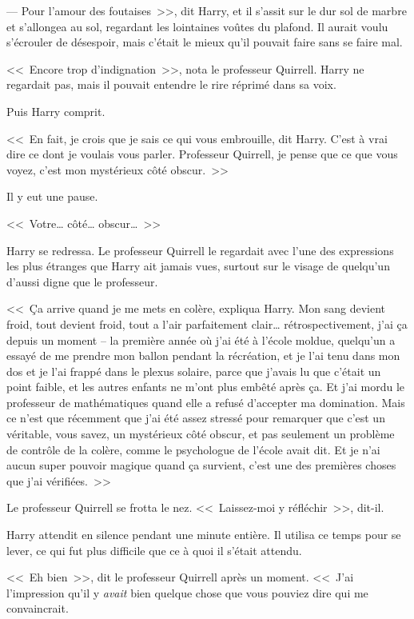 --- Pour l'amour des foutaises~>>, dit Harry, et il s'assit sur le dur sol de marbre et s'allongea au sol, regardant les lointaines voûtes du plafond. Il aurait voulu s'écrouler de désespoir, mais c'était le mieux qu'il pouvait faire sans se faire mal.

<<~Encore trop d'indignation~>>, nota le professeur Quirrell. Harry ne regardait pas, mais il pouvait entendre le rire réprimé dans sa voix.

Puis Harry comprit.

<<~En fait, je crois que je sais ce qui vous embrouille, dit Harry. C'est à vrai dire ce dont je voulais vous parler. Professeur Quirrell, je pense que ce que vous voyez, c'est mon mystérieux côté obscur.~>>

Il y eut une pause.

<<~Votre… côté… obscur…~>>

Harry se redressa. Le professeur Quirrell le regardait avec l'une des expressions les plus étranges que Harry ait jamais vues, surtout sur le visage de quelqu'un d'aussi digne que le professeur.

<<~Ça arrive quand je me mets en colère, expliqua Harry. Mon sang devient froid, tout devient froid, tout a l'air parfaitement clair… rétrospectivement, j'ai ça depuis un moment -- la première année où j'ai été à l'école moldue, quelqu'un a essayé de me prendre mon ballon pendant la récréation, et je l'ai tenu dans mon dos et je l'ai frappé dans le plexus solaire, parce que j'avais lu que c'était un point faible, et les autres enfants ne m'ont plus embêté après ça. Et j'ai mordu le professeur de mathématiques quand elle a refusé d'accepter ma domination. Mais ce n'est que récemment que j'ai été assez stressé pour remarquer que c'est un véritable, vous savez, un mystérieux côté obscur, et pas seulement un problème de contrôle de la colère, comme le psychologue de l'école avait dit. Et je n'ai aucun super pouvoir magique quand ça survient, c'est une des premières choses que j'ai vérifiées.~>>

Le professeur Quirrell se frotta le nez. <<~Laissez-moi y réfléchir~>>, dit-il.

Harry attendit en silence pendant une minute entière. Il utilisa ce temps pour se lever, ce qui fut plus difficile que ce à quoi il s'était attendu.

<<~Eh bien~>>, dit le professeur Quirrell après un moment. <<~J'ai l'impression qu'il y \emph{avait} bien quelque chose que vous pouviez dire qui me convaincrait.

